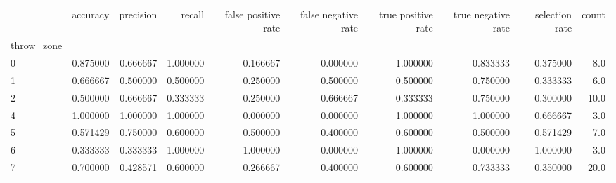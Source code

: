 \begin{tabular}{lrrrrrrrrr}
\toprule
{} &  accuracy &  precision &    recall &  false positive rate &  false negative rate &  true positive rate &  true negative rate &  selection rate &  count \\
throw\_zone &           &            &           &                      &                      &                     &                     &                 &        \\
\midrule
0          &  0.875000 &   0.666667 &  1.000000 &             0.166667 &             0.000000 &            1.000000 &            0.833333 &        0.375000 &    8.0 \\
1          &  0.666667 &   0.500000 &  0.500000 &             0.250000 &             0.500000 &            0.500000 &            0.750000 &        0.333333 &    6.0 \\
2          &  0.500000 &   0.666667 &  0.333333 &             0.250000 &             0.666667 &            0.333333 &            0.750000 &        0.300000 &   10.0 \\
4          &  1.000000 &   1.000000 &  1.000000 &             0.000000 &             0.000000 &            1.000000 &            1.000000 &        0.666667 &    3.0 \\
5          &  0.571429 &   0.750000 &  0.600000 &             0.500000 &             0.400000 &            0.600000 &            0.500000 &        0.571429 &    7.0 \\
6          &  0.333333 &   0.333333 &  1.000000 &             1.000000 &             0.000000 &            1.000000 &            0.000000 &        1.000000 &    3.0 \\
7          &  0.700000 &   0.428571 &  0.600000 &             0.266667 &             0.400000 &            0.600000 &            0.733333 &        0.350000 &   20.0 \\
\bottomrule
\end{tabular}
